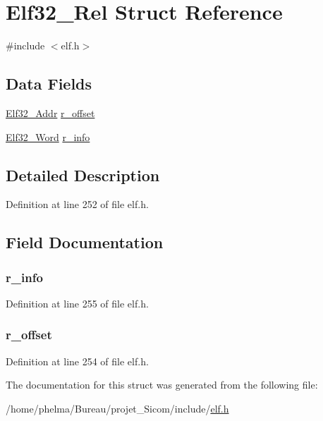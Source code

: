 \hypertarget{struct_elf32___rel}{\section{Elf32\-\_\-\-Rel Struct Reference}
\label{struct_elf32___rel}
}


{\ttfamily \#include $<$elf.\-h$>$}

\subsection*{Data Fields}
\begin{DoxyCompactItemize}
\item 
\hyperlink{elf_8h_a40c6d4571e6001f443cc6a6474620158}{Elf32\-\_\-\-Addr} \hyperlink{struct_elf32___rel_af7703a68dd2cbebc5df1fc4ac1ac75a8}{r\-\_\-offset}
\item 
\hyperlink{elf_8h_af5924ece606c732e86f8263a19408e45}{Elf32\-\_\-\-Word} \hyperlink{struct_elf32___rel_ac6df6d36f5c8d656fe4e749c859283af}{r\-\_\-info}
\end{DoxyCompactItemize}


\subsection{Detailed Description}


Definition at line 252 of file elf.\-h.



\subsection{Field Documentation}
\hypertarget{struct_elf32___rel_ac6df6d36f5c8d656fe4e749c859283af}{
\subsubsection[{r\-\_\-info}]{ r\-\_\-info}}\label{struct_elf32___rel_ac6df6d36f5c8d656fe4e749c859283af}


Definition at line 255 of file elf.\-h.

\hypertarget{struct_elf32___rel_af7703a68dd2cbebc5df1fc4ac1ac75a8}{
\subsubsection[{r\-\_\-offset}]{ r\-\_\-offset}}\label{struct_elf32___rel_af7703a68dd2cbebc5df1fc4ac1ac75a8}


Definition at line 254 of file elf.\-h.



The documentation for this struct was generated from the following file\-:\begin{DoxyCompactItemize}
\item 
/home/phelma/\-Bureau/projet\-\_\-\-Sicom/include/\hyperlink{elf_8h}{elf.\-h}\end{DoxyCompactItemize}

